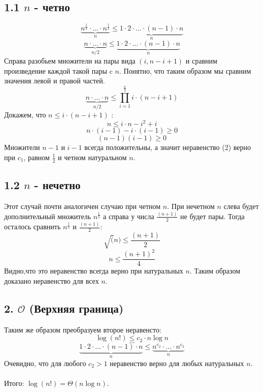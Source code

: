 \documentclass{article}
\begin{document}
\subsection*{1.1 $n$ - четно}
\begin{equation}
\underbrace{n^{\frac{1}{2}} \cdot \ldots \cdot n^{\frac{1}{2}}}_{n} \leq \underbrace{1 \cdot 2 \cdot \ldots \cdot (n - 1) \cdot n}_{n}
\end{equation}
$$\underbrace{n \cdot \ldots \cdot n}_{n/2} \leq \underbrace{1 \cdot 2 \cdot \ldots \cdot (n - 1) \cdot n}_{n}$$
Справа разобьем множители на пары вида $(i, n - i + 1)$ и сравним произведение каждой такой пары c $n$. Понятно, что таким образом мы сравним значения левой и правой частей.
$$\underbrace{n \cdot \ldots \cdot n}_{n/2} \leq \prod_{i=1}^{\frac{n}{2}}i \cdot (n - i + 1)$$
Докажем, что $n \leq i \cdot (n - i + 1) $ :
$$n \leq i \cdot n - i^{2} + i$$
$$n \cdot (i - 1) - i \cdot (i - 1) \geq 0$$
$$(n - 1)(i - 1) \geq 0$$
Множители $n - 1$ и $i - 1$ всегда положительны, а значит неравенство (2) верно при $c_1$, равном $\frac{1}{2}$ и четном натуральном $n$.

\subsection*{1.2 $n$ - нечетно}
Этот случай почти аналогичен случаю при четном $n$. При нечетном $n$ слева будет дополнительный множитель $n^{\frac{1}{2}}$ а справа у числа $\frac{(n + 1)}{2}$ не будет пары. Тогда осталось сравнить $n^{\frac{1}{2}}$ и $\frac{(n + 1)}{2}$:
$$\sqrt(n) \leq \frac{(n + 1)}{2}$$
$$n \leq \frac{(n + 1)^2}{4}$$
Видно,что это неравенство всегда верно при натуральных $n$. Таким образом доказано неравенство для всех $n$.
\subsection*{2. $\mathcal{O}$ (Верхняя граница)}
Таким же образом преобразуем второе неравенсто:
$$\log(n!) \leq c_2 \cdot n \log n$$
$$\dots$$
$$\underbrace{1 \cdot 2 \cdot \ldots \cdot (n - 1) \cdot  n}_{n} \leq \underbrace{n^{c_2} \cdot \ldots \cdot n^{c_2}}_{n}$$
Очевидно, что для любого $c_2 > 1$ неравенство верно для любых натуральных $n$. 
\\\\
Итого: $\log(n!) =\Theta(n\log n).$
\end{document}
